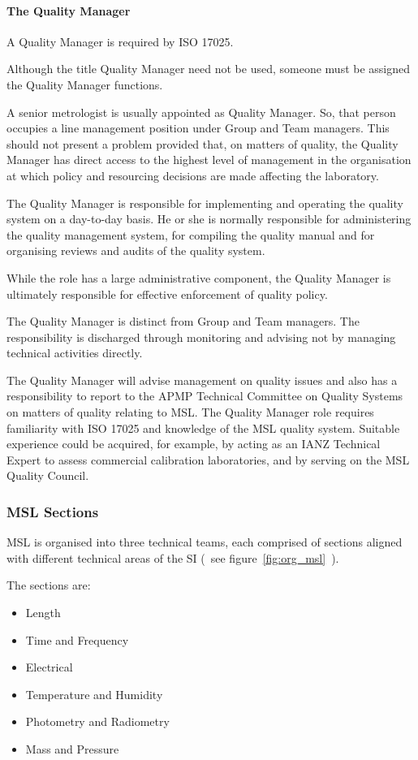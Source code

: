 \paragraph{The Quality Manager}
A Quality Manager is required by ISO 17025. 

Although the title Quality Manager need not be used, someone must be 
assigned the Quality Manager functions. 

A senior metrologist is usually appointed as Quality Manager. So, that person occupies a line management position under Group and Team managers. This should not present a problem provided that, on matters of quality, the Quality Manager has direct access to the highest level of management in the organisation at which policy and resourcing decisions are made affecting the 
laboratory.

The Quality Manager is responsible for implementing and operating the quality system on a day-to-day basis. He or she is normally responsible for administering the quality management system, for compiling the quality manual and for organising reviews and audits of the quality system.

While the role has a large administrative component, the Quality Manager is ultimately responsible for effective enforcement of quality policy. 

The Quality Manager is distinct from Group and Team managers. The responsibility is discharged through monitoring and advising not by managing technical activities directly.

The Quality Manager will advise management on quality issues and also has a responsibility to report to the APMP Technical Committee on Quality Systems on matters of quality relating to MSL.
The Quality Manager role requires familiarity with ISO 17025 and knowledge of the MSL quality system. Suitable experience could be acquired, for example, by acting as an IANZ Technical Expert to assess commercial calibration laboratories, and by serving on the MSL Quality Council.

\subsubsection{MSL Sections}
MSL is organised into three technical teams, each comprised of sections aligned with different technical areas of the SI (~see figure~\ref{fig:org_msl}~).

The sections are: 
\begin{itemize}
\item	Length
\item	Time and Frequency 
\item	Electrical 
\item	Temperature and Humidity
\item	Photometry and Radiometry
\item	Mass and Pressure
\end{itemize}

